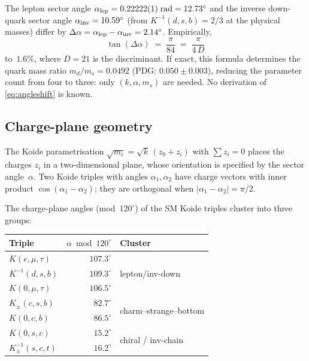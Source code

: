 \documentclass[12pt,a4paper]{article}
\begin{document}
The lepton sector angle $\alpha_{\rm lep} =
0.22222(1)\;\text{rad} = 12.73^\circ$ and the inverse down-quark sector
angle $\alpha_{\rm inv} = 10.59^\circ$ (from $K^{-1}(d,s,b) = 2/3$
at the physical masses) differ by $\Delta\alpha = \alpha_{\rm lep} -
\alpha_{\rm inv} = 2.14^\circ$. Empirically,
\begin{equation}
  \tan(\Delta\alpha) \;=\; \frac{\pi}{84}
  \;=\; \frac{\pi}{4\,D}
  \label{eq:angleshift}
\end{equation}
to~$1.6\%$, where $D = 21$ is the discriminant.  If exact,
this formula determines the quark mass ratio
$m_d/m_s = 0.0492$ (PDG: $0.050 \pm 0.003$), reducing the parameter
count from four to three: only $(k, \alpha, m_s)$ are needed.
No derivation of \eqref{eq:angleshift} is known.

\subsection{Charge-plane geometry}
\label{sec:chargeplane}

The Koide parametrisation $\sqrt{m_i} = \sqrt{k}\,(z_0 + z_i)$ with
$\sum z_i = 0$ places the charges $z_i$ in a two-dimensional plane,
whose orientation is specified by the sector angle~$\alpha$. Two
Koide triples with angles $\alpha_1, \alpha_2$ have charge vectors
with inner product $\cos(\alpha_1 - \alpha_2)$; they are orthogonal
when $|\alpha_1 - \alpha_2| = \pi/2$.

The charge-plane angles (mod~$120^\circ$) of the SM Koide triples
cluster into three groups:
\begin{center}
\begin{tabular}{lrl}
\toprule
Triple & $\alpha \bmod 120^\circ$ & Cluster \\
\midrule
$K(e,\mu,\tau)$           & $107.3^\circ$ & \multirow{3}{*}{lepton/inv-down}\\
$K^{-1}(d,s,b)$           & $109.3^\circ$ & \\
$K(0,\mu,\tau)$            & $106.5^\circ$ & \\
\midrule
$K_\pm(c,s,b)$            & $82.7^\circ$  & \multirow{2}{*}{charm--strange--bottom} \\
$K(0,c,b)$                & $86.5^\circ$  & \\
\midrule
$K(0,s,c)$                & $15.2^\circ$  & \multirow{2}{*}{chiral / inv-chain} \\
$K^{-1}_\pm(s,c,t)$       & $16.2^\circ$  & \\
\bottomrule
\end{tabular}
\end{center}
\end{document}
